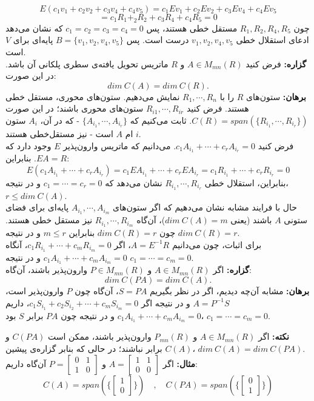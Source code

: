 $$E(c_1v_1+c_2v_2+c_3v_4+c_4v_5)=c_1Ev_1+c_2Ev_2+c_3Ev_4+c_4Ev_5$$
$$= c_1R_1+_2R_2+c_3R_4+c_4R_5 = 0$$
چون $R_1,R_2,R_4,R_5$ مستقل‌ خطی هستند، پس $c_1=c_2=c_3=c_4=0$ که نشان می‌دهد ادعا‌ی استقلال‌ خطی $v_1,v_2,v_4,v_5$ درست است. پس $B=\{v_1,v_2,v_4,v_5\}$ پایه‌ای برای $V$ است.\\
\textbf{گزاره:}
فرض کنید $A\in M_{mn}(R)$ و $R$ ماتریس تحویل‌ یافته‌ی سطری پلکانی آن باشد. در این صورت:
$$dim\:C(A)=dim\:C(R).$$
\textbf{برهان:}
ستون‌های $R$ را با $R_1,\cdots,R_n$ نمایش می‌دهیم. ستون‌های محوری، مستقل‌ خطی هستند. فرض کنید $R_{i1},\cdots,R_{ir}$ ستون‌های محوری باشند؛ در این صورت $C(R) = span(\{R_{i_1},\cdots,R_{i_r}\})$. ثابت می‌کنیم که $\{A_{i_1},\cdots,A_{i_r}\}$ - که در آن، $A_i$ ستون $i$ ام $A$ است - نیز مستقل‌خطی هستند.\\ فرض کنید $c_1A_{i_1}+\cdots+c_rA_{i_r}=0$. می‌دانیم که ماتریس وارون‌پذیر $E$ وجود دارد که $EA=R$. بنابراین:
$$E(c_1A_{i_1}+\cdots+c_rA_{i_r}) = c_1EA_{i_1}+\cdots+c_rEA_{i_r}=c_1R_{i_1}+\cdots+c_rR_{i_r}=0$$
بنابراین، استقلال‌ خطی $R_{i_1},\cdots,R_{i_r}$ نشان می‌دهد که $c_1=\cdots=c_r=0$ و در نتیجه، $r\leq dim\:C(A)$. \\
حال با فرایند مشابه نشان می‌دهیم که اگر ستون‌های $A_{i_1},\cdots,A_{i_m}$ پایه‌ای برای فضا‌ی ستونی $A$ باشند (یعنی $dim\:C(A)=m$)، آن‌گاه $R_{i_1},\cdots,R_{i_m}$ نیز مستقل‌ خطی هستند.
چون $dim\:C(R)=r$ بنابراین $m\leq r$ و در نتیجه $dim\:C(R) = r$.\\
برای اثبات، چون می‌دانیم $A=E^{-1}R$، اگر $c_1R_{i_1}+\cdots+c_mR_{i_m}=0$، آنگاه $c_1A_{i_1}+\cdots+c_mA_{i_m}=0$ و در نتیجه $c_1=\cdots=c_m=0$.\\
\textbf{گزاره:}
اگر $A\in M_{mn}(R)$ و $P\in M_{mn}(R)$ وارون‌پذیر باشند، آن‌گاه:
$$dim\:C(PA)=dim\:C(A).$$
\textbf{برهان:}
مشابه آن‌چه دیدیم، اگر در نظر بگیریم $S = PA$، آن‌گاه چون $P$ وارون‌پذیر است، $A = P^{-1}S$ و در نتیجه اگر $c_1 S_{i_1} + c_2 S_{i_2} + \cdots + c_m S_{i_m} = 0$، داریم $c_1A_{i_1}+\cdots+c_mA_{i_m}=0$ و در نتیجه چون $PA$ برابر $S$ بود، $c_1=\cdots=c_m=0$.

\textbf{نکته:}
اگر $A\in M_{mn}(R)$ و $P_{mn}(R)$ وارون‌پذیر باشند، ممکن است $C(PA)$ و $C(A)$ برابر نباشند؛ در حالی که بنابر گزاره‌ی پیشین، $dim\:C(A) = dim\:C(PA)$.\\
\textbf{مثال:}
اگر $A=\begin{bmatrix}
1&1\\
0&0
\end{bmatrix}$ و $P=\begin{bmatrix}
0&1\\
1&0
\end{bmatrix}$ آن‌گاه داریم:
$$C(A) = span(\{\begin{bmatrix}1\\0\end{bmatrix}\})\quad,\quad C(PA) = span(\{\begin{bmatrix}0\\1\end{bmatrix}\})$$

